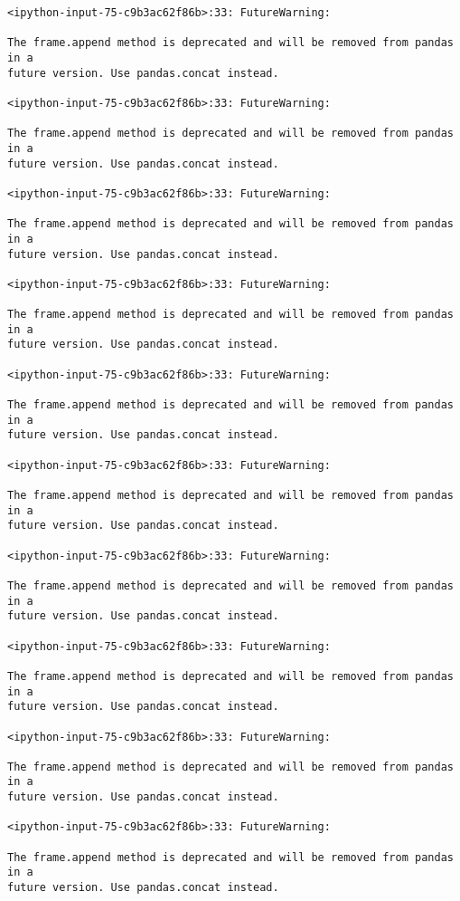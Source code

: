 \documentclass[11pt]{article}
\begin{document}
    \begin{Verbatim}[commandchars=\\\{\}]
<ipython-input-75-c9b3ac62f86b>:33: FutureWarning:

The frame.append method is deprecated and will be removed from pandas in a
future version. Use pandas.concat instead.

<ipython-input-75-c9b3ac62f86b>:33: FutureWarning:

The frame.append method is deprecated and will be removed from pandas in a
future version. Use pandas.concat instead.

<ipython-input-75-c9b3ac62f86b>:33: FutureWarning:

The frame.append method is deprecated and will be removed from pandas in a
future version. Use pandas.concat instead.

<ipython-input-75-c9b3ac62f86b>:33: FutureWarning:

The frame.append method is deprecated and will be removed from pandas in a
future version. Use pandas.concat instead.

<ipython-input-75-c9b3ac62f86b>:33: FutureWarning:

The frame.append method is deprecated and will be removed from pandas in a
future version. Use pandas.concat instead.

<ipython-input-75-c9b3ac62f86b>:33: FutureWarning:

The frame.append method is deprecated and will be removed from pandas in a
future version. Use pandas.concat instead.

<ipython-input-75-c9b3ac62f86b>:33: FutureWarning:

The frame.append method is deprecated and will be removed from pandas in a
future version. Use pandas.concat instead.

<ipython-input-75-c9b3ac62f86b>:33: FutureWarning:

The frame.append method is deprecated and will be removed from pandas in a
future version. Use pandas.concat instead.

<ipython-input-75-c9b3ac62f86b>:33: FutureWarning:

The frame.append method is deprecated and will be removed from pandas in a
future version. Use pandas.concat instead.

<ipython-input-75-c9b3ac62f86b>:33: FutureWarning:

The frame.append method is deprecated and will be removed from pandas in a
future version. Use pandas.concat instead.


\end{Verbatim}
\end{document}

